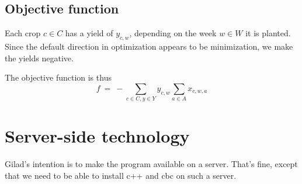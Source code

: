\documentclass[11pt]{amsart}
\begin{document}
\subsection{Objective function}

Each crop $c\in C$ has a yield of  $y_{c,w}$, depending on the week
$w\in W$ it is planted. Since the default direction in optimization
appears to be minimization, we make the yields negative.

The objective function is thus
\[
   f 
   \ = \
   -\sum_{c\in C, y\in Y} y_{c,w} \sum_{a\in A} x_{c,w,a}
\]

\section{Server-side technology}

Gilad's intention is to make the program available on a server. That's
fine, except that we need to be able to install c++ and cbc on such a server.



\end{document}
